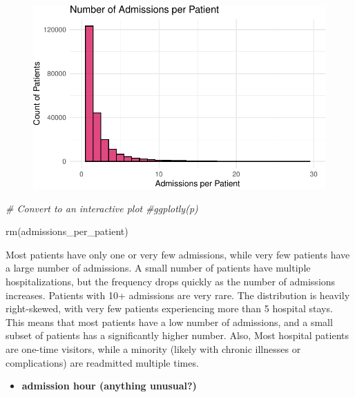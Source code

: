 \documentclass[
]{article}
\newenvironment{Shaded}{\begin{snugshade}}{\end{snugshade}}
\newcommand{\CommentTok}[1]{\textcolor[rgb]{0.56,0.35,0.01}{\textit{#1}}}
\newcommand{\FunctionTok}[1]{\textcolor[rgb]{0.00,0.00,0.00}{#1}}
\newcommand{\NormalTok}[1]{\textcolor[rgb]{0.00,0.00,0.00}{#1}}
\providecommand{\tightlist}{%
  \setlength{\itemsep}{0pt}\setlength{\parskip}{0pt}}\usepackage{longtable,booktabs,array}
\begin{document}
\begin{figure}[H]

{\centering \includegraphics{hw3_files/figure-pdf/unnamed-chunk-23-1.pdf}

}

\end{figure}

\begin{Shaded}
\begin{Highlighting}[]
\CommentTok{\# Convert to an interactive plot}
\CommentTok{\#ggplotly(p)}

\FunctionTok{rm}\NormalTok{(admissions\_per\_patient)}
\end{Highlighting}
\end{Shaded}

Most patients have only one or very few admissions, while very few
patients have a large number of admissions. A small number of patients
have multiple hospitalizations, but the frequency drops quickly as the
number of admissions increases. Patients with 10+ admissions are very
rare. The distribution is heavily right-skewed, with very few patients
experiencing more than 5 hospital stays. This means that most patients
have a low number of admissions, and a small subset of patients has a
significantly higher number. Also, Most hospital patients are one-time
visitors, while a minority (likely with chronic illnesses or
complications) are readmitted multiple times.

\begin{itemize}
\tightlist
\item
  \textbf{admission hour (anything unusual?)}
\end{itemize}
\end{document}
